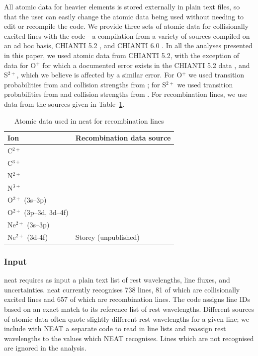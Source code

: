 \documentclass[useAMS,usenatbib]{mn2e}
\begin{document}
All atomic data for heavier elements is stored externally in plain text files, so that the user can easily change the atomic data being used without needing to edit or recompile the code.  We provide three sets of atomic data for collisionally excited lines with the code - a compilation from a variety of sources compiled on an ad hoc basis, CHIANTI 5.2 \citep{2006ApJS..162..261L}, and CHIANTI 6.0 \citep{2009A&A...498..915D}.  In all the analyses presented in this paper, we used atomic data from CHIANTI 5.2, with the exception of data for O$^{+}$ for which a documented error exists in the CHIANTI 5.2 data \citep{2009MNRAS.397..903K}, and S$^{2+}$, which we believe is affected by a similar error.  For O$^{+}$ we used transition probabilities from \citet{1982MNRAS.198..111Z} and collision strengths from \citet{1976MNRAS.177...31P}; for S$^{2+}$ we used transition probabilities from \citet{1982MNRAS.199.1025M} and collision strengths from \citet{1983IAUS..103..143M}.  For recombination lines, we use data from the sources given in Table~\ref{RL_atomic_data}.

\begin{table}
\begin{tabular}{ll}
\hline
Ion & Recombination data source \\
\hline
C$^{2+}$ & \citet{2000AAS..142...85D} \\
C$^{3+}$ & \citet{1991AA...251..680P} \\
N$^{2+}$ & \citet{1990ApJS...73..513E} \\
N$^{3+}$ & \citet{1991AA...251..680P} \\
O$^{2+}$ (3s--3p) & \citet{1994AA...282..999S} \\
O$^{2+}$ (3p--3d, 3d--4f) & \citet{1995MNRAS.272..369L} \\
Ne$^{2+}$ (3s--3p)& \citet{1998AAS..133..257K} \\
Ne$^{2+}$ (3d-4f) & Storey (unpublished) \\
\hline
\end{tabular}
\caption{Atomic data used in {\sc neat} for recombination lines}
\label{RL_atomic_data}
\end{table}

\subsubsection{Input}

{\sc neat} requires as input a plain text list of rest wavelengths, line fluxes, and uncertainties.  {\sc neat} currently recognises 738 lines, 81 of which are collisionally excited lines and 657 of which are recombination lines.  The code assigns line IDs based on an exact match to its reference list of rest wavelengths.  Different sources of atomic data often quote slightly different rest wavelengths for a given line; we include with {\sc NEAT} a separate code to read in line lists and reassign rest wavelengths to the values which {\sc NEAT} recognises.  Lines which are not recognised are ignored in the analysis.
\end{document}
